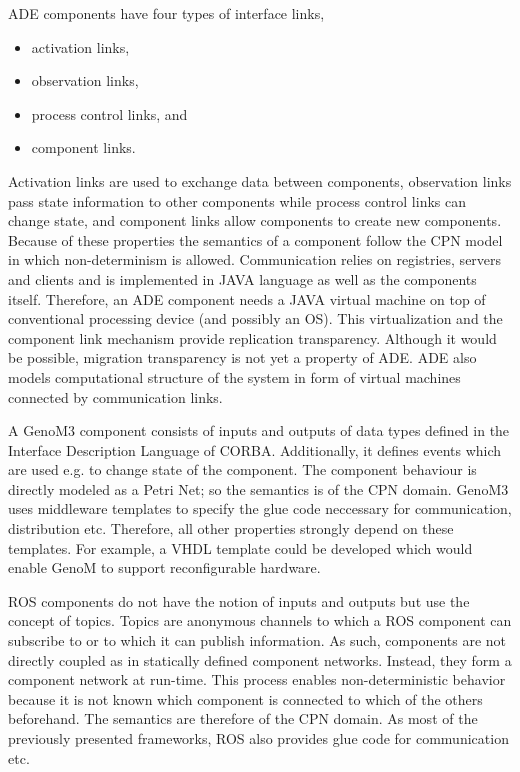 \documentclass[a4paper,twocolumn]{esapub2005} %
\begin{document}
ADE components have four types of interface links,
\begin{itemize}
    \item activation links,
    \item observation links,
    \item process control links, and
    \item component links.
\end{itemize}
Activation links are used to exchange data between components,
observation links pass state information to other components while process control links can change state,
and component links allow components to create new components.
Because of these properties the semantics of a component follow the CPN model in which non-determinism is allowed.
Communication relies on registries, servers and clients and is implemented in JAVA language as well as the components itself.
Therefore, an ADE component needs a JAVA virtual machine on top of conventional processing device (and possibly an OS).
This virtualization and the component link mechanism provide replication transparency.
Although it would be possible, migration transparency is not yet a property of ADE.
ADE also models computational structure of the system in form of virtual machines connected by communication links.

A GenoM3 component consists of inputs and outputs of data types defined in the Interface Description Language of CORBA.
Additionally, it defines events which are used e.g. to change state of the component.
The component behaviour is directly modeled as a Petri Net; so the semantics is of the CPN domain.
GenoM3 uses middleware templates to specify the glue code neccessary for communication, distribution etc.
Therefore, all other properties strongly depend on these templates.
For example, a VHDL template could be developed which would enable GenoM to support reconfigurable hardware.

ROS components do not have the notion of inputs and outputs but use the concept of topics.
Topics are anonymous channels to which a ROS component can subscribe to or to which it can publish information.
As such, components are not directly coupled as in statically defined component networks.
Instead, they form a component network at run-time.
This process enables non-deterministic behavior because it is not known which component is connected to which of the others beforehand.
The semantics are therefore of the CPN domain.
As most of the previously presented frameworks, ROS also provides glue code for communication etc.
\end{document}
